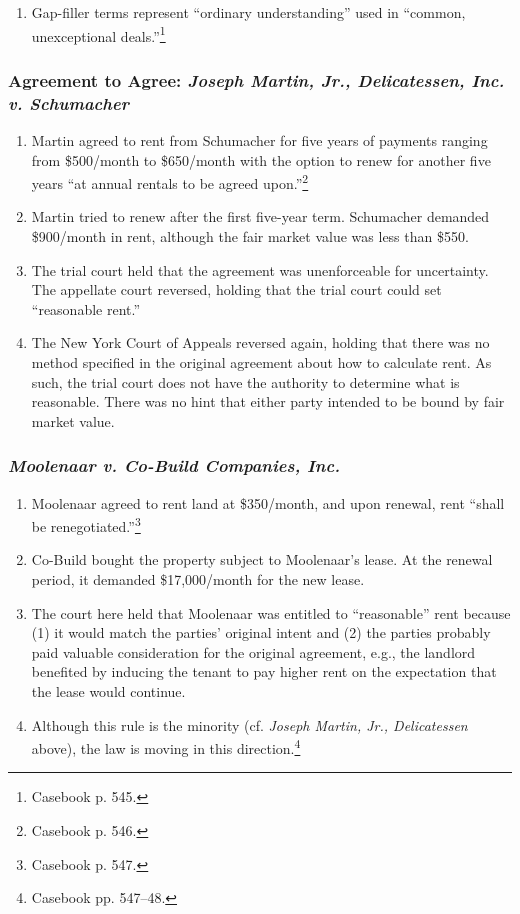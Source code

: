 \begin{enumerate}
    \item Gap-filler terms represent ``ordinary understanding'' used in 
    ``common, unexceptional deals.''\footnote{Casebook p. 545.}
\end{enumerate}

\subsubsection{Agreement to Agree: \emph{Joseph Martin, Jr., Delicatessen, 
Inc. v. Schumacher}}

\begin{enumerate}
    \item Martin agreed to rent from Schumacher for five years of payments 
    ranging from \$500/month to \$650/month with the option to renew for 
    another five years ``at annual rentals to be agreed 
    upon.''\footnote{Casebook p. 546.}
    \item Martin tried to renew after the first five-year term. Schumacher 
    demanded \$900/month in rent, although the fair market value was less than 
    \$550.
    \item The trial court held that the agreement was unenforceable for 
    uncertainty. The appellate court reversed, holding that the trial court 
    could set ``reasonable rent.''
    \item The New York Court of Appeals reversed again, holding that there was 
    no method specified in the original agreement about how to calculate rent. 
    As such, the trial court does not have the authority to determine what is 
    reasonable. There was no hint that either party intended to be bound by 
    fair market value.
\end{enumerate}

\subsubsection{\emph{Moolenaar v. Co-Build Companies, Inc.}}

\begin{enumerate}
    \item Moolenaar agreed to rent land at \$350/month, and upon renewal, rent 
    ``shall be renegotiated.''\footnote{Casebook p. 547.}
    \item Co-Build bought the property subject to Moolenaar's lease. At the 
    renewal period, it demanded \$17,000/month for the new lease.
    \item The court here held that Moolenaar was entitled to ``reasonable'' 
    rent because (1) it would match the parties' original intent and (2) the 
    parties probably paid valuable consideration for the original agreement, 
    e.g., the landlord benefited by inducing the tenant to pay higher rent on 
    the expectation that the lease would continue.
    \item Although this rule is the minority (cf. \emph{Joseph Martin, Jr., 
    Delicatessen} above), the law is moving in this 
    direction.\footnote{Casebook pp. 547--48.}
\end{enumerate}

